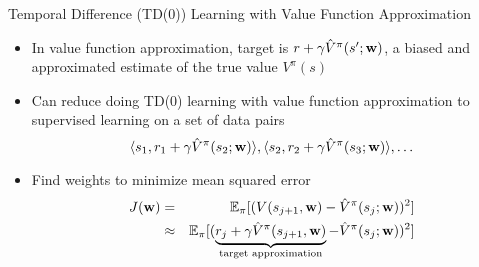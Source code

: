 \documentclass[aspectratio=169]{../latex_main/tntbeamer}  %
\begin{document}
\begin{frame}[c]{Temporal Difference (TD(0)) Learning with Value
		Function Approximation}
	
	\begin{itemize}
		\item In value function approximation, target is $r + \gamma \hat{V}^\pi (s'; \mathbf{w})$, a biased and approximated estimate of the true value $V^\pi(s)$
		\item Can reduce doing TD(0) learning with value function approximation to supervised learning on a set of data pairs
		$$\langle  s_1, r_1+ \gamma \hat{V}^\pi (s_2; \mathbf{w}) \rangle, \langle  s_2, r_2+ \gamma \hat{V}^\pi (s_3; \mathbf{w}) \rangle, \ldots $$
		\item Find weights to minimize mean squared error
		\begin{eqnarray*}
		J(\mathbf{w}) &=& \mathbb{E}_\pi [(V(s_{j+1}, \mathbf{w}) - \hat{V}^\pi(s_j;\mathbf{w}))^2]\\
		&\approx& \mathbb{E}_\pi [(\underbrace{r_j + \gamma \hat{V}^\pi(s_{j+1}, \mathbf{w})}_{\text{target approximation}} - \hat{V}^\pi(s_j;\mathbf{w}))^2]
		\end{eqnarray*}

	\end{itemize}
	
\end{frame}
\end{document}
